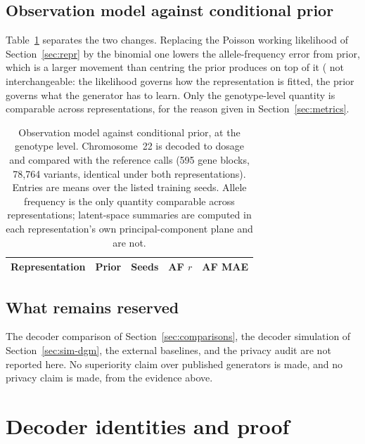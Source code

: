 \documentclass[11pt,a4paper]{article}
\begin{document}
\subsection{Observation model against conditional prior}
\label{sec:res-representation}

Table~\ref{tab:representation} separates the two changes. Replacing the Poisson
working likelihood of Section~\ref{sec:repr} by the binomial one lowers the
allele-frequency error from %
prior, which is a larger movement than centring the prior produces on top of it
(%
not interchangeable: the likelihood governs how the representation is fitted,
the prior governs what the generator has to learn. Only the genotype-level
quantity is comparable across representations, for the reason given in
Section~\ref{sec:metrics}.

\begin{table}[t]
\centering
\small
\caption{Observation model against conditional prior, at the genotype level.
Chromosome~22 is decoded to dosage and compared with the reference calls (595
gene blocks, 78,764 variants, identical under both representations). Entries are
means over the listed training seeds. Allele frequency is the only quantity
comparable across representations; latent-space summaries are computed in each
representation's own principal-component plane and are not.}
\label{tab:representation}
\begin{tabular}{llccc}
\toprule
Representation & Prior & Seeds & AF $r$ & AF MAE \\
\midrule
\bottomrule
\end{tabular}
\end{table}

\subsection{What remains reserved}
\label{sec:res-reserved}

The decoder comparison of Section~\ref{sec:comparisons}, the decoder simulation
of Section~\ref{sec:sim-dgm}, the external baselines, and the privacy audit are
not reported here. No superiority claim over published generators is made, and
no privacy claim is made, from the evidence above.

\appendix
\section{Decoder identities and proof}
\label{app:proof}
\end{document}

